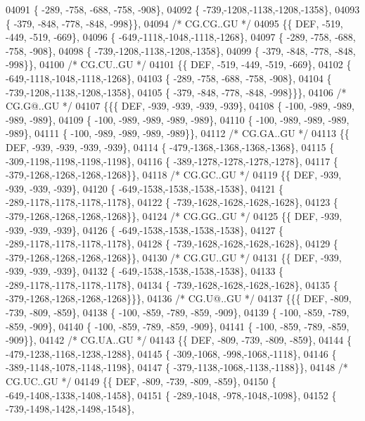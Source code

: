 \begin{DoxyCode}
04091 \{ -289, -758, -688, -758, -908\},
04092 \{ -739,-1208,-1138,-1208,-1358\},
04093 \{ -379, -848, -778, -848, -998\}\},
04094 \textcolor{comment}{/* CG.CG..GU */}
04095 \{\{  DEF, -519, -449, -519, -669\},
04096 \{ -649,-1118,-1048,-1118,-1268\},
04097 \{ -289, -758, -688, -758, -908\},
04098 \{ -739,-1208,-1138,-1208,-1358\},
04099 \{ -379, -848, -778, -848, -998\}\},
04100 \textcolor{comment}{/* CG.CU..GU */}
04101 \{\{  DEF, -519, -449, -519, -669\},
04102 \{ -649,-1118,-1048,-1118,-1268\},
04103 \{ -289, -758, -688, -758, -908\},
04104 \{ -739,-1208,-1138,-1208,-1358\},
04105 \{ -379, -848, -778, -848, -998\}\}\},
04106 \textcolor{comment}{/* CG.G@..GU */}
04107 \{\{\{  DEF, -939, -939, -939, -939\},
04108 \{ -100, -989, -989, -989, -989\},
04109 \{ -100, -989, -989, -989, -989\},
04110 \{ -100, -989, -989, -989, -989\},
04111 \{ -100, -989, -989, -989, -989\}\},
04112 \textcolor{comment}{/* CG.GA..GU */}
04113 \{\{  DEF, -939, -939, -939, -939\},
04114 \{ -479,-1368,-1368,-1368,-1368\},
04115 \{ -309,-1198,-1198,-1198,-1198\},
04116 \{ -389,-1278,-1278,-1278,-1278\},
04117 \{ -379,-1268,-1268,-1268,-1268\}\},
04118 \textcolor{comment}{/* CG.GC..GU */}
04119 \{\{  DEF, -939, -939, -939, -939\},
04120 \{ -649,-1538,-1538,-1538,-1538\},
04121 \{ -289,-1178,-1178,-1178,-1178\},
04122 \{ -739,-1628,-1628,-1628,-1628\},
04123 \{ -379,-1268,-1268,-1268,-1268\}\},
04124 \textcolor{comment}{/* CG.GG..GU */}
04125 \{\{  DEF, -939, -939, -939, -939\},
04126 \{ -649,-1538,-1538,-1538,-1538\},
04127 \{ -289,-1178,-1178,-1178,-1178\},
04128 \{ -739,-1628,-1628,-1628,-1628\},
04129 \{ -379,-1268,-1268,-1268,-1268\}\},
04130 \textcolor{comment}{/* CG.GU..GU */}
04131 \{\{  DEF, -939, -939, -939, -939\},
04132 \{ -649,-1538,-1538,-1538,-1538\},
04133 \{ -289,-1178,-1178,-1178,-1178\},
04134 \{ -739,-1628,-1628,-1628,-1628\},
04135 \{ -379,-1268,-1268,-1268,-1268\}\}\},
04136 \textcolor{comment}{/* CG.U@..GU */}
04137 \{\{\{  DEF, -809, -739, -809, -859\},
04138 \{ -100, -859, -789, -859, -909\},
04139 \{ -100, -859, -789, -859, -909\},
04140 \{ -100, -859, -789, -859, -909\},
04141 \{ -100, -859, -789, -859, -909\}\},
04142 \textcolor{comment}{/* CG.UA..GU */}
04143 \{\{  DEF, -809, -739, -809, -859\},
04144 \{ -479,-1238,-1168,-1238,-1288\},
04145 \{ -309,-1068, -998,-1068,-1118\},
04146 \{ -389,-1148,-1078,-1148,-1198\},
04147 \{ -379,-1138,-1068,-1138,-1188\}\},
04148 \textcolor{comment}{/* CG.UC..GU */}
04149 \{\{  DEF, -809, -739, -809, -859\},
04150 \{ -649,-1408,-1338,-1408,-1458\},
04151 \{ -289,-1048, -978,-1048,-1098\},
04152 \{ -739,-1498,-1428,-1498,-1548\},

\end{DoxyCode}
